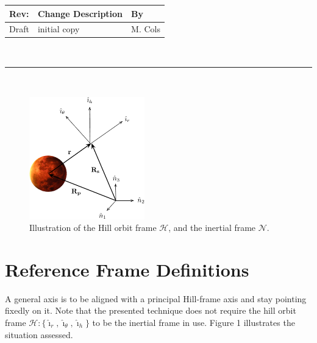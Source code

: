 \documentclass[]{AVSSimReportMemo}
\begin{document}
\makeCover


%
%
\pagestyle{empty}
{\renewcommand{\arraystretch}{2}
\noindent
\begin{longtable}{|p{0.5in}|p{4.5in}|p{1.14in}|}
\hline
{\bfseries Rev}: & {\bfseries Change Description} & {\bfseries By} \\
\hline
Draft & initial copy & M. Cols \\
\hline

\end{longtable}
}

\newpage
\setcounter{page}{1}
\pagestyle{fancy}

\tableofcontents
~\\ \hrule ~\\

\begin{figure}[htb]
	\centerline{
	\includegraphics[width=5cm]{Figures/hillPoint}
	}
	\caption{Illustration of the Hill orbit frame $\mathcal{H}$, and the inertial frame $\mathcal{N}$.}
	\label{fig:Fig1}
\end{figure}

\section{Reference Frame Definitions}
A general axis is to be aligned with a principal Hill-frame axis and stay pointing fixedly on it. Note that the presented technique does not require the hill orbit frame $\mathcal{H}:\{ \hat{\bm\imath}_{r}, \hat{\bm\imath}_{\theta}, \hat{\bm\imath}_{h} \}$ to be the inertial frame in use. Figure 1 illustrates the situation assessed.
\end{document}
